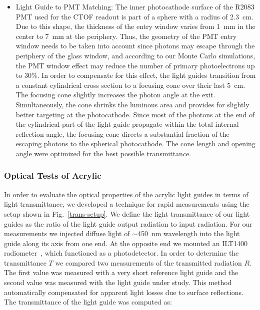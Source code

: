 \documentclass{elsart}
\begin{document}
\begin{itemize}
\item Light Guide to PMT Matching: The inner photocathode surface of the R2083 PMT used for
the CTOF readout is part of a sphere with a radius of 2.3~cm. Due to this shape, the thickness of the
entry window varies from 1~mm in the center to 7~mm at the periphery. Thus, the geometry of the
PMT entry window needs to be taken into account since photons may escape through the periphery
of the glass window, and according to our Monte Carlo simulations, the PMT window effect may
reduce the number of primary photoelectrons up to 30\%. In order to compensate for this effect,
the light guides transition from a constant cylindrical cross section to a focusing cone over their last 
5~cm. The focusing cone slightly increases the photon angle at the exit. Simultaneously, the cone
shrinks the luminous area and provides for slightly better targeting at the photocathode. Since most
of the photons at the end of the cylindrical part of the light guide propagate within the total internal
reflection angle, the focusing cone directs a substantial fraction of the escaping photons to the
spherical photocathode. The cone length and opening angle were optimized for the best possible
transmittance. 

\end{itemize}

\subsubsection{Optical Tests of Acrylic}
\label{optical-tests}
  
In order to evaluate the optical properties of the acrylic light guides in terms of light
transmittance, we developed a technique for rapid measurements using the setup shown in 
Fig.~\ref{trans-setup}. We define the light transmittance of our light guides as the ratio 
of the light guide output radiation to input radiation. For our measurements we injected 
diffuse light of $\sim$450~nm wavelength into the light guide along its axis from one end. 
At the opposite end we mounted an ILT1400 radiometer~\cite{ilt-ref}, which functioned as a
photodetector. In order to determine the transmittance $T$ we compared two measurements
of the transmitted radiation $R$. The first value was measured with a very short reference
light guide and the second value was measured with the light guide under study. This method
automatically compensated for apparent light losses due to surface reflections. The transmittance
of the light guide was computed as:  
\end{document}
